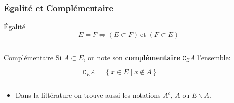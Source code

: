 \documentclass{beamer}
\begin{document}
\begin{frame}
  \small
  \frametitle{Égalité et Complémentaire}
 \begin{block}{Égalité}
  \begin{equation}
    E = F \iff  (E \subset F)\; \text{et}\; (F \subset E)
  \end{equation} 
 \end{block} 
 \pause
\begin{columns}
  \begin{column}{0.7\textwidth}
    
    \begin{block}{Complémentaire}
      Si $A \subset E$, on note son \textbf{\alert{complémentaire}} $\mathtt{C}_E A$
       l'ensemble:

       \begin{equation}
         \mathtt{C}_E A = \left\{ x \in E \;|\; x \not\in A \right\}
       \end{equation}
    \end{block}
  \end{column}
  \begin{column}{0.3\textwidth}
    
  \end{column}
\end{columns}
\begin{itemize}
  \item Dans la littérature on trouve aussi les notations  $A^c$, $\overline{A}$
    ou $ E\backslash A$.
\end{itemize}
\end{frame}
\end{document}
